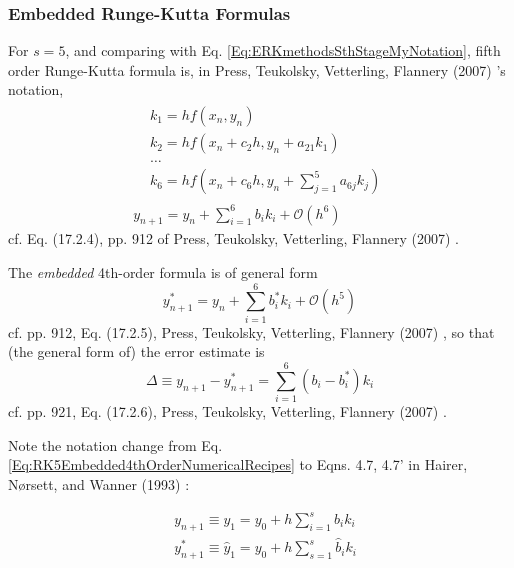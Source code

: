 \documentclass[10pt]{amsart}
\begin{document}
\begin{multicols*}{2}
\subsubsection{Embedded Runge-Kutta Formulas}

For $s=5$, and comparing with Eq. \ref{Eq:ERKmethodsSthStageMyNotation}, fifth order Runge-Kutta formula is, in Press, Teukolsky, Vetterling, Flannery (2007) \cite{PTVF2007}'s notation,
\begin{equation}\label{Eq:FifthOrderRungeKuttaNumericalRecipes}
	\begin{gathered}
		\begin{aligned}
			& k_1 = h f(x_n, y_n) \\
			& k_2 = hf(x_n + c_2 h, y_n + a_{21} k_1) \\
			& \dots \\
			& k_6 = hf(x_n + c_6 h, y_n + \sum_{j=1}^5 a_{6j} k_j)
		\end{aligned} \\
	y_{n+1} = y_n + \sum_{i=1}^6 b_i k_i + \mathcal{O}(h^6)
	\end{gathered}
\end{equation} cf. Eq. (17.2.4),  pp. 912 of Press, Teukolsky, Vetterling, Flannery (2007) \cite{PTVF2007}.

The \emph{embedded} 4th-order formula is of general form
\begin{equation}\label{Eq:RK5Embedded4thOrderNumericalRecipes}
y^*_{n+1} = y_n + \sum_{i=1}^6 b_i^* k_i + \mathcal{O}(h^5)
\end{equation}
cf. pp. 912, Eq. (17.2.5), Press, Teukolsky, Vetterling, Flannery (2007) \cite{PTVF2007}, so that (the general form of) the error estimate is
\begin{equation}
	\Delta \equiv y_{n+1} - y^*_{n+1} = \sum_{i=1}^6 (b_i -b_i^*) k_i
\end{equation}
cf. pp. 921, Eq. (17.2.6), Press, Teukolsky, Vetterling, Flannery (2007) \cite{PTVF2007}.

Note the notation change from Eq. \ref{Eq:RK5Embedded4thOrderNumericalRecipes} to Eqns. 4.7, 4.7' in  Hairer, N\o rsett, and Wanner (1993) \cite{HNW1993}:

\[
\begin{aligned}
& y_{n+1} \equiv y_1  = y_0 + h \sum_{i=1}^s b_i k_i \\
& y_{n+1}^* \equiv \widehat{y}_1 = y_0 + h \sum_{s=1}^s \widehat{b}_i k_i
\end{aligned}
\]


\end{multicols*}
\end{document}
